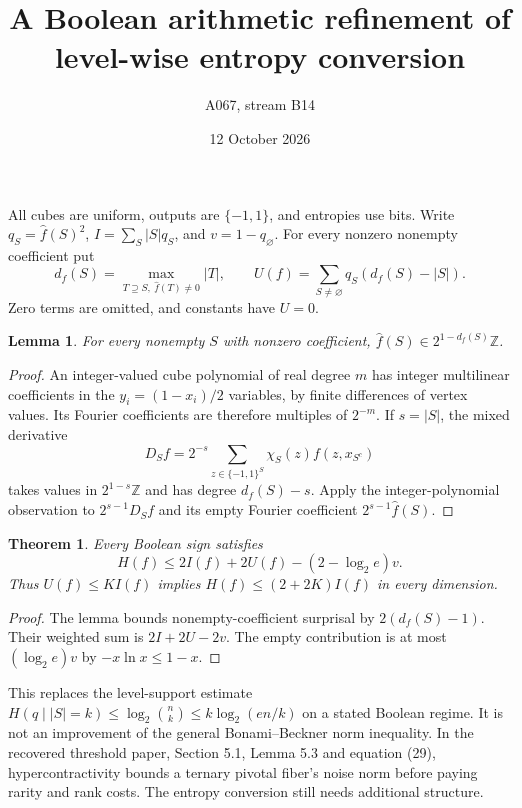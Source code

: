 \documentclass[11pt]{article}
\newtheorem{theorem}{Theorem}
\newtheorem{lemma}{Lemma}
\newcommand{\wh}{\widehat}
\begin{document}
\title{A Boolean arithmetic refinement of level-wise entropy conversion}
\author{A067, stream B14}\date{12 October 2026}\maketitle
All cubes are uniform, outputs are $\{-1,1\}$, and entropies use bits.
Write $q_S=\wh f(S)^2$, $I=\sum_S |S|q_S$, and $v=1-q_\varnothing$.
For every nonzero nonempty coefficient put
\[
d_f(S)=\max_{T\supseteq S,\ \wh f(T)\ne0}|T|,
\qquad U(f)=\sum_{S\ne\varnothing}q_S(d_f(S)-|S|).
\]
Zero terms are omitted, and constants have $U=0$.
\begin{lemma}
For every nonempty $S$ with nonzero coefficient,
$\wh f(S)\in2^{1-d_f(S)}\mathbb Z$.
\end{lemma}
\begin{proof}
An integer-valued cube polynomial of real degree $m$ has integer
multilinear coefficients in the $y_i=(1-x_i)/2$ variables, by finite
differences of vertex values. Its Fourier coefficients are therefore
multiples of $2^{-m}$. If $s=|S|$, the mixed derivative
\[
D_S f=2^{-s}\sum_{z\in\{-1,1\}^S}\chi_S(z)f(z,x_{S^c})
\]
takes values in $2^{1-s}\mathbb Z$ and has degree $d_f(S)-s$.
Apply the integer-polynomial observation to $2^{s-1}D_S f$ and its
empty Fourier coefficient $2^{s-1}\wh f(S)$.
\end{proof}
\begin{theorem}
Every Boolean sign satisfies
\[
H(f)\le2I(f)+2U(f)-(2-\log_2 e)v.
\]
Thus $U(f)\le KI(f)$ implies $H(f)\le(2+2K)I(f)$ in every dimension.
\end{theorem}
\begin{proof}
The lemma bounds nonempty-coefficient surprisal by $2(d_f(S)-1)$.
Their weighted sum is $2I+2U-2v$. The empty contribution is at most
$(\log_2 e)v$ by $-x\ln x\le1-x$.
\end{proof}
This replaces the level-support estimate
$H(q\mid |S|=k)\le\log_2\binom nk\le k\log_2(en/k)$
on a stated Boolean regime. It is not an improvement of the general
Bonami--Beckner norm inequality. In the recovered threshold paper,
Section 5.1, Lemma 5.3 and equation (29), hypercontractivity bounds
a ternary pivotal fiber's noise norm before paying rarity and rank
costs. The entropy conversion still needs additional structure.
\end{document}
